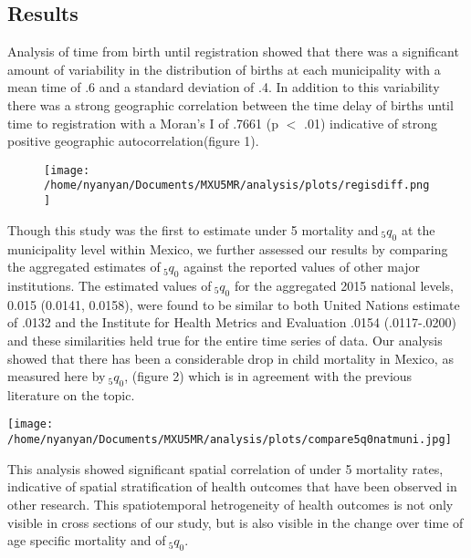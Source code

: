 \documentclass[a0,portrait]{a0poster}
\begin{document}
\begin{multicols}{2}
\section*{Results}

Analysis of time from birth until registration showed that there was a significant amount of variability in the distribution of births at each municipality with a mean time of .6  and a standard deviation of .4. In addition to this variability there was a strong geographic correlation between the time delay of births until time to registration with a Moran's I of .7661 (p $<$ .01) indicative of strong positive geographic autocorrelation(figure 1).
%
\begin{wrapfigure}{l}{12cm} %
\texttt{[image: /home/nyanyan/Documents/MXU5MR/analysis/plots/regisdiff.png]}
\end{wrapfigure}
%

Though this study was the first to estimate under 5 mortality and$~_5q_{0}$ at the municipality level within Mexico, we further assessed our results by comparing the aggregated estimates of$~_5q_{0}$ against the reported values of other major institutions. The estimated values of$~_5q_{0}$ for the aggregated 2015 national levels, 0.015 (0.0141, 0.0158), were found to be similar to both United Nations estimate of .0132 and the Institute for Health Metrics and Evaluation .0154 (.0117-.0200) and these similarities held true for the entire time series of data. Our analysis showed that there has been a considerable drop in child mortality in Mexico, as measured here by$~_5q_{0}$, (figure 2) which is in agreement with the previous literature on the topic.

%
\begin{center}\vspace{2cm}
\texttt{[image: /home/nyanyan/Documents/MXU5MR/analysis/plots/compare5q0natmuni.jpg]}
\end{center}\vspace{2cm}
%

\text{}

This analysis showed significant spatial correlation of under 5 mortality rates, indicative of spatial stratification of health outcomes that have been observed in other research. This spatiotemporal hetrogeneity of health outcomes is not only visible in cross sections of our study, but is also visible in the change over time of age specific mortality and  of$~_5q_{0}$.


\end{multicols}
\end{document}
